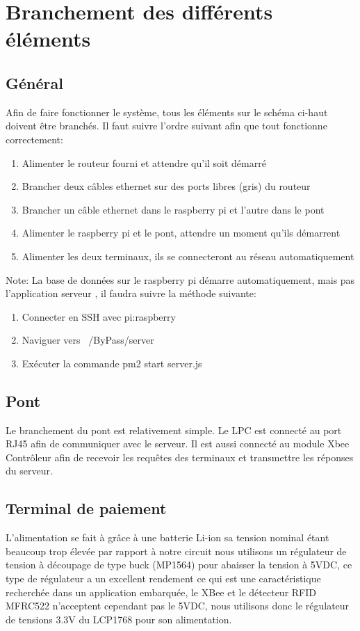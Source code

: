 \section{Branchement des différents éléments}
	\subsection{Général}
	Afin de faire fonctionner le système, tous les éléments sur le schéma ci-haut doivent être branchés. Il faut suivre l’ordre suivant afin que tout fonctionne correctement:
	\begin{enumerate}
		\item Alimenter le routeur fourni et attendre qu’il soit démarré
		\item Brancher deux câbles ethernet sur des ports libres (gris) du routeur
		\item Brancher un câble ethernet dans le raspberry pi et l’autre dans le pont
		\item Alimenter le raspberry pi et le pont, attendre un moment qu’ils démarrent
		\item Alimenter les deux terminaux, ils se connecteront au réseau automatiquement
	\end{enumerate}

Note: La base de données sur le raspberry pi démarre automatiquement, mais pas l’application \og serveur \fg{}, il faudra suivre la méthode suivante:
	\begin{enumerate}
		\item Connecter en SSH avec pi:raspberry
		\item Naviguer vers 	~/ByPass/server
		\item Exécuter la commande pm2 start server.js 
	\end{enumerate}

	\subsection{Pont}
	Le branchement du pont est relativement simple. Le LPC est connecté au port RJ45 afin de communiquer avec le serveur. Il est aussi connecté au module Xbee Contrôleur afin de recevoir les requêtes des terminaux et transmettre les réponses du serveur.

	\subsection{Terminal de paiement}
	L’alimentation se fait à grâce à une batterie Li-ion sa tension nominal étant beaucoup trop élevée par rapport à notre circuit nous utilisons un régulateur de tension à découpage de type buck (MP1564) pour abaisser la tension à 5VDC, ce type de régulateur a un excellent rendement ce qui est une caractéristique recherchée dans un application embarquée, le XBee et le détecteur RFID MFRC522 n’acceptent cependant pas le 5VDC, nous utilisons donc le régulateur de tensions 3.3V du LCP1768  pour son alimentation. 

